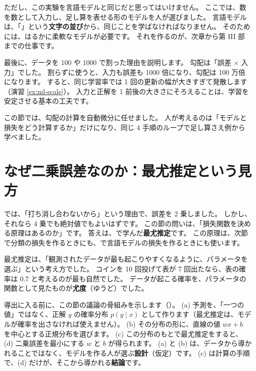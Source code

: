 ただし、この実験を言語モデルと同じだと思ってはいけません。
ここでは、数を数として入力し、足し算を表せる形のモデルを人が選びました。
言語モデルは、「」という\textbf{文字の並び}から、同じことを学ばなければなりません。
そのためには、はるかに柔軟なモデルが必要です。
それを作るのが、次章から第 III 部までの仕事です。

最後に、データを 100 や 1000 で割った理由を説明します。
勾配は「誤差 $\times$ 入力」でした。
割らずに使うと、入力も誤差も 1000 倍になり、勾配は 100 万倍になります。
すると、同じ学習率では 1 回の更新の幅が大きすぎて発散します（演習 \ref{ex:ml-scale}）。
入力と正解を 1 前後の大きさにそろえることは、学習を安定させる基本の工夫です。

この節では、勾配の計算を自動微分に任せました。
人が考えるのは「モデルと損失をどう計算するか」だけになり、同じ 4 手順のループで足し算さえ例から学べました。

\section{なぜ二乗誤差なのか：最尤推定という見方}\label{sec:ml-mle}

では、「打ち消し合わないから」という理由で、誤差を 2 乗しました。
しかし、それなら 4 乗でも絶対値でもよいはずです。
この節の問いは、「損失関数を決める原理はあるのか」です。
答えは、で学んだ\textbf{最尤推定}です。
この原理は、次節で分類の損失を作るときにも、で言語モデルの損失を作るときにも使います。

最尤推定は、「観測されたデータが最も起こりやすくなるように、パラメータを選ぶ」という考え方でした。
コインを 10 回投げて表が 7 回出たなら、表の確率は 0.7 と考えるのが最も自然でした。
データが起こる確率を、パラメータの関数として見たものが\textbf{尤度}（ゆうど）でした。

導出に入る前に、この節の議論の骨組みを示します（）。
(a) 予測を、「一つの値」ではなく、正解 $y$ の確率分布 $p(y\mid x)$ として作ります（最尤推定は、モデルが確率を出さなければ使えません）。
(b) その分布の形に、直線の値 $wx+b$ を中心とする正規分布を選びます。
(c) この分布のもとで最尤推定をすると、(d) 二乗誤差を最小にする $w$ と $b$ が得られます。
(a) と (b) は、データから導かれることではなく、モデルを作る人が選ぶ\textbf{設計}（仮定）です。
(c) は計算の手順で、(d) だけが、そこから導かれる\textbf{結論}です。

